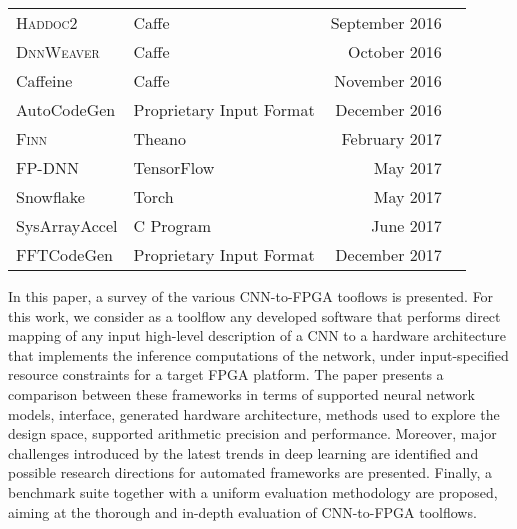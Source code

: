 \documentclass[format=acmsmall, review=false, screen=true]{acmart}
\begin{document}
\begin{table}[t]
{\begin{tabular}{l l r l}
		{\color{black} \textsc{Haddoc2} \cite{Abdelouahab_2016}\cite{Abdelouahab_2017}} &{\color{black} Caffe} & {\color{black}September 2016}\\
		
		\textsc{DnnWeaver} \cite{Sharma2016DnnweaverFH}\cite{Sharma_2016}   & Caffe & October 2016 \\ 
		
		Caffeine \cite{Zhang_2016} & Caffe & November 2016 \\
		
		{\color{black}AutoCodeGen \cite{Zhiqiang_Liu_2016}} & {\color{black} Proprietary Input Format} & {\color{black}December 2016} \\
		
		\textsc{Finn} \cite{Umuroglu_2017}\cite{Fraser_2017} & Theano & February 2017 \\
		
		FP-DNN \cite{Guan2017} & TensorFlow & May 2017 \\
		
		{\color{black}Snowflake \cite{Gokhale2017}\cite{Chang_2017}} & {\color{black} Torch} & {\color{black}May 2017} \\
		
		SysArrayAccel \cite{Wei2017} & C Program & June 2017 \\
		
		{\color{black}FFTCodeGen \cite{fft2017fpga}\cite{fftcodegen2017rpt}\cite{fft2017reconfig}\cite{fft2018fpga}} & {\color{black}Proprietary Input Format} & {\color{black}December 2017} \\
		
		\bottomrule
	\end{tabular}%
}
\vspace{-0.1cm}
\end{table}


In this paper, a survey of the various CNN-to-FPGA tooflows is presented. For this work, we consider as a toolflow any developed software that performs direct mapping of any input high-level description of a CNN %
to a hardware architecture that implements the inference computations of the network, under input-specified resource constraints for a target FPGA platform. The paper presents a comparison between these frameworks in terms of supported neural network models, interface, generated hardware architecture, methods used to explore the design space, supported arithmetic precision and performance. Moreover, major challenges introduced by the latest trends in deep learning are identified and possible research directions for automated frameworks are presented. Finally, a benchmark suite together with a uniform evaluation methodology are proposed, aiming at the thorough and in-depth evaluation of CNN-to-FPGA toolflows.
\end{document}
